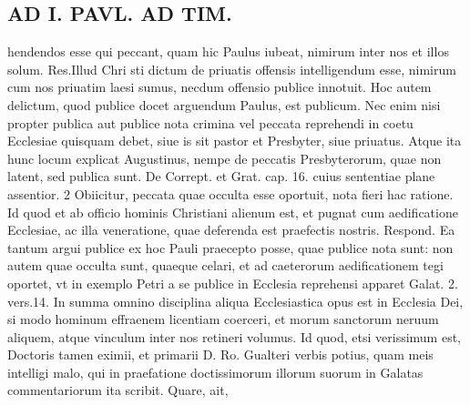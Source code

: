 \documentclass{article}
\begin{document}
\begin{pages}
\section*{AD I. PAVL. AD TIM. }
\marginpar{[ p.Jle ]}\pstart hendendos esse qui peccant, quam hic Paulus iubeat, nimirum inter nos et illos solum. Res.Illud Chri sti dictum de priuatis offensis intelligendum esse, nimirum cum nos priuatim laesi sumus, necdum offensio publice innotuit. Hoc autem delictum, quod publice docet arguendum Paulus, est publicum. Nec enim nisi propter publica aut publice nota crimina vel peccata reprehendi in coetu Ecclesiae quisquam debet, siue is sit pastor et Presbyter, siue priuatus. Atque ita hunc locum explicat Augustinus, nempe de peccatis Presbyterorum, quae non latent, sed publica sunt. De Corrept. et Grat. cap. 16. cuius sententiae plane assentior. 2 Obiicitur, peccata quae occulta esse oportuit, nota fieri hac ratione. Id quod et ab officio hominis Christiani alienum est, et pugnat cum aedificatione Ecclesiae, ac illa veneratione, quae deferenda est praefectis nostris. Respond. Ea tantum argui publice ex hoc Pauli praecepto posse, quae publice nota sunt: non autem quae occulta sunt, quaeque celari, et ad caeterorum aedificationem tegi oportet, vt in exemplo Petri a se publice in Ecclesia reprehensi apparet Galat. 2. vers.14. In summa omnino disciplina aliqua Ecclesiastica opus est in Ecclesia Dei, si modo hominum effraenem licentiam coerceri, et morum sanctorum neruum aliquem, atque vinculum inter nos retineri volumus. Id quod, etsi verissimum est, Doctoris tamen eximii, et primarii D. Ro. Gualteri verbis potius, quam meis intelligi malo, qui in praefatione doctissimorum illorum suorum in Galatas commentariorum ita scribit. Quare, ait,  \pend

\end{pages}
\end{document}
